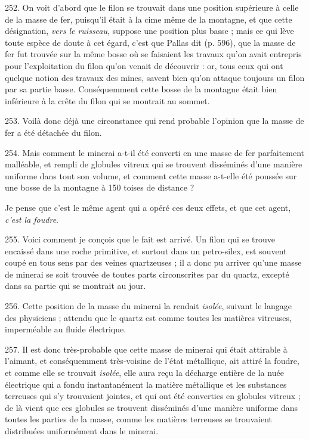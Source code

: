 \documentclass[a4paper, 11pt, oneside, polutonikogreek, french]{article}
\begin{document}
252. On voit d'abord que le filon se trouvait dans une position supérieure à celle de la masse de fer, puisqu'il était à la cime même de la montagne, et que cette désignation, \emph{vers le ruisseau}, suppose une position plus basse ; mais ce qui lève toute espèce de doute à cet égard, c'est que Pallas dit (p. 596), que la masse de fer fut trouvée sur la même bosse où se faisaient les travaux qu'on avait entrepris pour l'exploitation du filon qu'on venait de découvrir : or, tous ceux qui ont quelque notion des travaux des mines, savent bien qu'on attaque toujours un filon par sa partie basse. Conséquemment cette bosse de la montagne était bien inférieure à la crête du filon qui se montrait au sommet.

253. Voilà donc déjà une circonstance qui rend probable l'opinion que la masse de fer a été détachée du filon.

254. Mais comment le minerai a-t-il été converti en une masse de fer parfaitement malléable, et rempli de globules vitreux qui se trouvent disséminés d'une manière uniforme dans tout son volume, et comment cette masse a-t-elle été poussée sur une bosse de la montagne à 150 toises de distance ?

Je pense que c'est le même agent qui a opéré ces deux effets, et que cet agent, \emph{c'est la foudre}.

255. Voici comment je conçois que le fait est arrivé. Un filon qui se trouve encaissé dans une roche primitive, et surtout dans un petro-silex, est souvent coupé en tous sens par des veines quartzeuses ; il a donc pu arriver qu'une masse de minerai se soit trouvée de toutes parts circonscrites par du quartz, excepté dans sa partie qui se montrait au jour.

256. Cette position de la masse du minerai la rendait \emph{isolée}, suivant le langage des physiciens ; attendu que le quartz est comme toutes les matières vitreuses, imperméable au fluide électrique.

257. Il est donc très-probable que cette masse de minerai qui était attirable à l'aimant, et conséquemment très-voisine de l'état métallique, ait attiré la foudre, et comme elle se trouvait \emph{isolée}, elle aura reçu la décharge entière de la nuée électrique qui a fondu instantanément la matière métallique et les substances terreuses qui s'y trouvaient jointes, et qui ont été converties en globules vitreux ; de là vient que ces globules se trouvent disséminés d'une manière uniforme dans toutes les parties de la masse, comme les matières terreuses se trouvaient distribuées uniformément dans le minerai.
\end{document}
